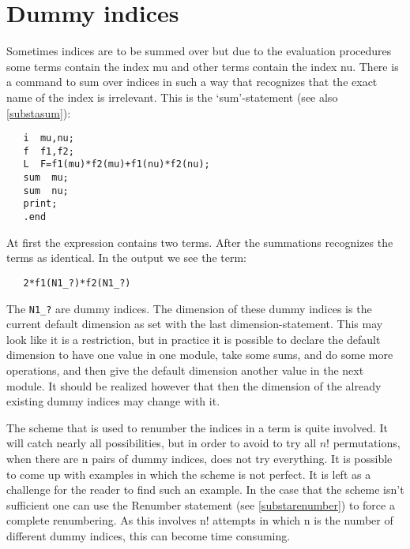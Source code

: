 \section{Dummy indices}

\label{sect-dummies}
Sometimes indices are to be summed over but due to the 
evaluation procedures some terms contain the index mu and other terms 
contain the index nu. There is a command to sum over indices in such a way 
that {\FORM} recognizes that the exact name of the index is irrelevant. 
This is the `sum'-statement (see also \ref{substasum}):%
\begin{verbatim}
   i  mu,nu;
   f  f1,f2;
   L  F=f1(mu)*f2(mu)+f1(nu)*f2(nu);
   sum  mu;
   sum  nu;
   print;
   .end
\end{verbatim}
At first the expression contains two terms. After the summations {\FORM} 
recognizes the terms as identical. In the output we see the term: 
\begin{verbatim}
   2*f1(N1_?)*f2(N1_?)
\end{verbatim}
The \verb:N1_?: are dummy indices. 
The dimension of these dummy indices is the current 
default dimension as set with the last 
dimension-statement. This may look like it is a restriction, but in 
practice it is possible to declare the default dimension to have one 
value in one module, take some sums, and do some more operations, and 
then give the default dimension another value in the next module. It should 
be realized however that then the dimension of the already existing dummy 
indices may change with it.

The scheme that is used to renumber the 
indices in a term is quite 
involved. It will catch nearly all possibilities, but in order to avoid 
to try all $n!$ permutations, when there are n pairs of dummy indices, 
{\FORM} does not try everything. It is possible to come up with examples 
in which the scheme is not perfect. It is left as a 
challenge for the reader to find such an example. In the case that the 
scheme isn't sufficient one can use the Renumber statement (see 
\ref{substarenumber}) to force a complete renumbering. As this involves 
n! attempts in which n is the number of different dummy indices, this can 
become time consuming.


